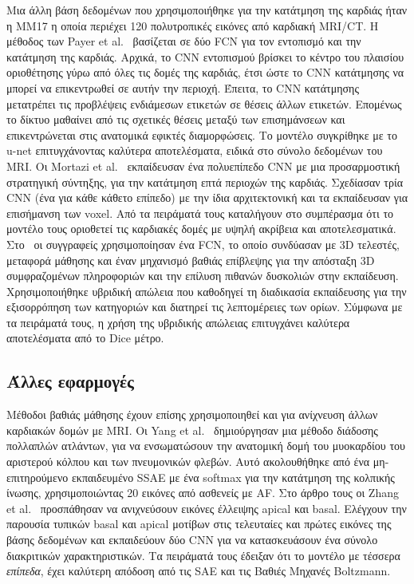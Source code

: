 Μια άλλη βάση δεδομένων που χρησιμοποιήθηκε για την κατάτμηση της καρδιάς ήταν η MM17 η οποία περιέχει 120 πολυτροπικές εικόνες από καρδιακή MRI/CT\@.
Η μέθοδος των Payer et al.~\cite{payer2017multi} βασίζεται σε δύο FCN για τον εντοπισμό και την κατάτμηση της καρδιάς.
Αρχικά, το CNN εντοπισμού βρίσκει το κέντρο του πλαισίου οριοθέτησης γύρω από όλες τις δομές της καρδιάς, έτσι ώστε το CNN κατάτμησης να μπορεί να επικεντρωθεί σε αυτήν την περιοχή.
Έπειτα, το CNN κατάτμησης μετατρέπει τις προβλέψεις ενδιάμεσων ετικετών σε θέσεις άλλων ετικετών.
Επομένως το δίκτυο μαθαίνει από τις σχετικές θέσεις μεταξύ των επισημάνσεων και επικεντρώνεται στις ανατομικά εφικτές διαμορφώσεις.
Το μοντέλο συγκρίθηκε με το u-net επιτυγχάνοντας καλύτερα αποτελέσματα, ειδικά στο σύνολο δεδομένων του MRI\@.
Οι Mortazi et al.~\cite{mortazi2017multi} εκπαίδευσαν ένα πολυεπίπεδο CNN με μια προσαρμοστική στρατηγική σύντηξης, για την κατάτμηση επτά περιοχών της καρδιάς.
Σχεδίασαν τρία CNN (ένα για κάθε κάθετο επίπεδο) με την ίδια αρχιτεκτονική και τα εκπαίδευσαν για επισήμανση των voxel.
Από τα πειράματά τους καταλήγουν στο συμπέρασμα ότι το μοντέλο τους οριοθετεί τις καρδιακές δομές με υψηλή ακρίβεια και αποτελεσματικά.
Στο~\cite{yang2017hybrid} οι συγγραφείς χρησιμοποίησαν ένα FCN, το οποίο συνδύασαν με 3D τελεστές, μεταφορά μάθησης και έναν μηχανισμό βαθιάς επίβλεψης για την απόσταξη 3D συμφραζομένων πληροφοριών και την επίλυση πιθανών δυσκολιών στην εκπαίδευση.
Χρησιμοποιήθηκε υβριδική απώλεια που καθοδηγεί τη διαδικασία εκπαίδευσης για την εξισορρόπηση των κατηγοριών και διατηρεί τις λεπτομέρειες των ορίων.
Σύμφωνα με τα πειράματά τους, η χρήση της υβριδικής απώλειας επιτυγχάνει καλύτερα αποτελέσματα από το Dice μέτρο.

\subsection{Άλλες εφαρμογές}
Μέθοδοι βαθιάς μάθησης έχουν επίσης χρησιμοποιηθεί και για ανίχνευση άλλων καρδιακών δομών με MRI\@.
Οι Yang et al.~\cite{yang2017segmenting} δημιούργησαν μια μέθοδο διάδοσης πολλαπλών ατλάντων, για να ενσωματώσουν την ανατομική δομή του μυοκαρδίου του αριστερού κόλπου και των πνευμονικών φλεβών.
Αυτό ακολουθήθηκε από ένα μη-επιτηρούμενο εκπαιδευμένο SSAE με ένα softmax για την κατάτμηση της κολπικής ίνωσης, χρησιμοποιώντας 20 εικόνες από ασθενείς με AF\@.
Στο άρθρο τους οι Zhang et al.~\cite{zhang2016automated} προσπάθησαν να ανιχνεύσουν εικόνες έλλειψης apical και basal.
Ελέγχουν την παρουσία τυπικών basal και apical μοτίβων στις τελευταίες και πρώτες εικόνες της βάσης δεδομένων και εκπαιδεύουν δύο CNN για να κατασκευάσουν ένα σύνολο διακριτικών χαρακτηριστικών.
Τα πειράματά τους έδειξαν ότι το μοντέλο με τέσσερα \textit{επίπεδα}, έχει καλύτερη απόδοση από τις SAE και τις Βαθιές Μηχανές Boltzmann.

